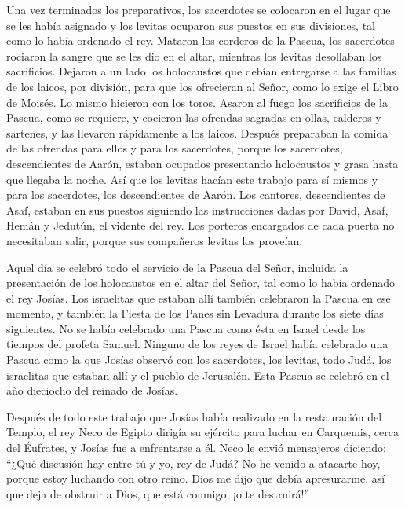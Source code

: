  Una vez terminados los preparativos, los sacerdotes se
colocaron en el lugar que se les había asignado y los levitas ocuparon
sus puestos en sus divisiones, tal como lo había ordenado el rey.
 Mataron los corderos de la Pascua, los sacerdotes rociaron
la sangre que se les dio en el altar, mientras los levitas desollaban
los sacrificios.  Dejaron a un lado los holocaustos que
debían entregarse a las familias de los laicos, por división, para que
los ofrecieran al Señor, como lo exige el Libro de Moisés. Lo mismo
hicieron con los toros.  Asaron al fuego los sacrificios de
la Pascua, como se requiere, y cocieron las ofrendas sagradas en ollas,
calderos y sartenes, y las llevaron rápidamente a los laicos.
 Después preparaban la comida de las ofrendas para ellos y
para los sacerdotes, porque los sacerdotes, descendientes de Aarón,
estaban ocupados presentando holocaustos y grasa hasta que llegaba la
noche. Así que los levitas hacían este trabajo para sí mismos y para los
sacerdotes, los descendientes de Aarón.  Los cantores,
descendientes de Asaf, estaban en sus puestos siguiendo las
instrucciones dadas por David, Asaf, Hemán y Jedutún, el vidente del
rey. Los porteros encargados de cada puerta no necesitaban salir, porque
sus compañeros levitas los proveían.

 Aquel día se celebró todo el servicio de la Pascua del
Señor, incluida la presentación de los holocaustos en el altar del
Señor, tal como lo había ordenado el rey Josías.  Los
israelitas que estaban allí también celebraron la Pascua en ese momento,
y también la Fiesta de los Panes sin Levadura durante los siete días
siguientes.  No se había celebrado una Pascua como ésta en
Israel desde los tiempos del profeta Samuel. Ninguno de los reyes de
Israel había celebrado una Pascua como la que Josías observó con los
sacerdotes, los levitas, todo Judá, los israelitas que estaban allí y el
pueblo de Jerusalén.  Esta Pascua se celebró en el año
dieciocho del reinado de Josías.

 Después de todo este trabajo que Josías había realizado en
la restauración del Templo, el rey Neco de Egipto dirigía su ejército
para luchar en Carquemis, cerca del Éufrates, y Josías fue a enfrentarse
a él.  Neco le envió mensajeros diciendo: ``¿Qué discusión
hay entre tú y yo, rey de Judá? No he venido a atacarte hoy, porque
estoy luchando con otro reino. Dios me dijo que debía apresurarme, así
que deja de obstruir a Dios, que está conmigo, ¡o te destruirá!''

